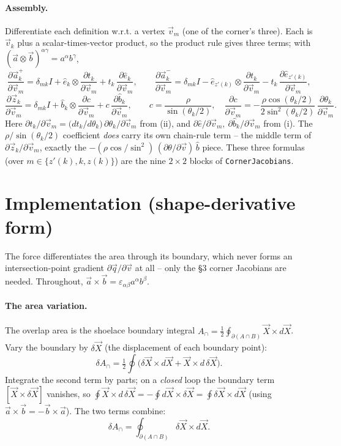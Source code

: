 \documentclass[11pt]{article}
\newcommand{\vv}[1]{\vec{#1}}
\newcommand{\half}{\tfrac{1}{2}}
\begin{document}
\paragraph{Assembly.} Differentiate each definition w.r.t. a vertex $\vv v_m$ (one of the corner's
three). Each is $\vv v_k$ plus a scalar-times-vector product, so the product rule gives three terms;
with $(\vv a\otimes\vv b)^{\alpha\gamma}=a^{\alpha}b^{\gamma}$,
\[
  \frac{\partial\vv a^{+}_k}{\partial\vv v_m}=\delta_{mk}I+\hat e_k\otimes\frac{\partial t_k}{\partial\vv v_m}+t_k\,\frac{\partial\hat e_k}{\partial\vv v_m},
  \qquad
  \frac{\partial\vv a^{-}_k}{\partial\vv v_m}=\delta_{mk}I-\hat e_{z'(k)}\otimes\frac{\partial t_k}{\partial\vv v_m}-t_k\,\frac{\partial\hat e_{z'(k)}}{\partial\vv v_m},
\]
\[
  \frac{\partial\vv z_k}{\partial\vv v_m}=\delta_{mk}I+\hat b_k\otimes\frac{\partial c}{\partial\vv v_m}+c\,\frac{\partial\hat b_k}{\partial\vv v_m},
  \qquad c=\frac{\rho}{\sin(\theta_k/2)},\quad
  \frac{\partial c}{\partial\vv v_m}=-\frac{\rho\cos(\theta_k/2)}{2\sin^2(\theta_k/2)}\,\frac{\partial\theta_k}{\partial\vv v_m}.
\]
Here $\partial t_k/\partial\vv v_m=\big(dt_k/d\theta_k\big)\,\partial\theta_k/\partial\vv v_m$ from
(ii), and $\partial\hat e/\partial\vv v_m,\ \partial\hat b_k/\partial\vv v_m$ from (i). The
$\rho/\sin(\theta_k/2)$ coefficient \emph{does} carry its own chain-rule term -- the middle term of
$\partial\vv z_k/\partial\vv v_m$, exactly the $-(\rho\cos\!/\!\sin^2)\,(\partial\theta/\partial\vv
v)\,\hat b$ piece. These three formulas (over $m\in\{z'(k),k,z(k)\}$) are the nine $2\times2$ blocks
of \texttt{CornerJacobians}.

\section{Implementation (shape-derivative form)}

The force differentiates the area through its boundary, which never forms an intersection-point
gradient $\partial\vv q/\partial\vv v$ at all -- only the \S3 corner Jacobians are needed.
Throughout, $\vv a\times\vv b=\varepsilon_{\alpha\beta}a^{\alpha}b^{\beta}$.

\paragraph{The area variation.} The overlap area is the shoelace boundary integral
$A_{\cap}=\half\oint_{\partial(A\cap B)}\vv X\times d\vv X$. Vary the boundary by $\delta\vv X$ (the
displacement of each boundary point):
\[
  \delta A_{\cap}=\half\oint\big(\delta\vv X\times d\vv X+\vv X\times d\,\delta\vv X\big).
\]
Integrate the second term by parts; on a \emph{closed} loop the boundary term $[\vv X\times\delta\vv
X]$ vanishes, so $\oint\vv X\times d\,\delta\vv X=-\oint d\vv X\times\delta\vv X=\oint\delta\vv
X\times d\vv X$ (using $\vv a\times\vv b=-\vv b\times\vv a$). The two terms combine:
\[
  \boxed{\ \delta A_{\cap}=\oint_{\partial(A\cap B)}\delta\vv X\times d\vv X.\ }
\]
\end{document}

